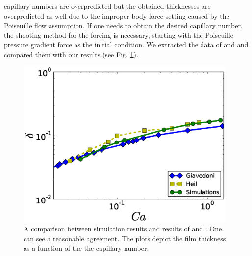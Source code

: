 \documentclass[preprint,12pt]{elsarticle}
\begin{document}
capillary numbers are overpredicted but the obtained thicknesses are overpredicted
as well due to the improper body force setting caused by the Poiseuille flow assumption. If one
needs to obtain the desired capillary number, the shooting method for the forcing is
necessary, starting with the Poiseuille pressure gradient force as the initial condition. We extracted
the data of 
\citet{giavedoni-numerical} and \citet{heil-bretherton} and compared them with our results (see 
Fig. \ref{fig:capillary:comparison}).
\begin{figure}
\includegraphics[width=0.97\textwidth]{Figures/Capillary/capillaries_comparison.eps}
\caption{A comparison between simulation results and results of
\citet{giavedoni-numerical} and \citet{heil-bretherton}. One can see a
reasonable agreement. The plots depict the film thickness as a function of the
the capillary number.\label{fig:capillary:comparison}}
\end{figure}
\end{document}
